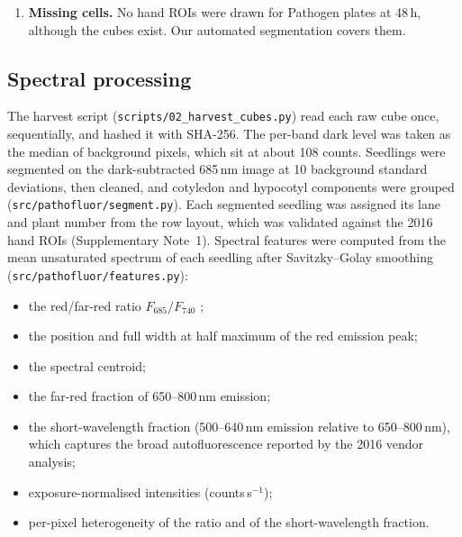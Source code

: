 \begin{enumerate}
  (Pathogen 3\,h plates 1--2 and 24\,h plate 4) were exported with the camera dark level
  (median \offsetMedian{} counts) still in them; all others were dark-subtracted (median
  \offsetCleanMedian{} counts). Because nothing fluoresces at wavelengths shorter than the
  excitation, each spectrum's mean below the excitation line (420--470\,nm in set A, 400--404\,nm
  in set B) was subtracted from it before features were computed (\texttt{scripts/01\_import\_rois.py}).
  \item \textbf{Missing cells.} No hand ROIs were drawn for Pathogen plates at 48\,h, although
  the cubes exist. Our automated segmentation covers them.
\end{enumerate}

\subsection{Spectral processing}\label{sec:features}
The harvest script (\texttt{scripts/02\_harvest\_cubes.py}) read each raw cube once,
sequentially, and hashed it with SHA-256. The per-band dark level was taken as the median of
background pixels, which sit at about 108 counts. Seedlings were segmented on the dark-subtracted
685\,nm image at 10 background standard deviations, then cleaned, and cotyledon and hypocotyl
components were grouped (\texttt{src/pathofluor/segment.py}). Each segmented seedling was
assigned its lane and plant number from the row layout, which was validated against the 2016
hand ROIs (Supplementary Note~1). Spectral features were computed from the mean unsaturated
spectrum of each seedling after Savitzky--Golay smoothing (\texttt{src/pathofluor/features.py}):
\begin{itemize}
  \item the red/far-red ratio $F_{685}/F_{740}$ \citep{buschmann2007};
  \item the position and full width at half maximum of the red emission peak;
  \item the spectral centroid;
  \item the far-red fraction of 650--800\,nm emission;
  \item the short-wavelength fraction (500--640\,nm emission relative to 650--800\,nm), which
  captures the broad autofluorescence reported by the 2016 vendor analysis;
  \item exposure-normalised intensities (counts\,s$^{-1}$);
  \item per-pixel heterogeneity of the ratio and of the short-wavelength fraction.
\end{itemize}

